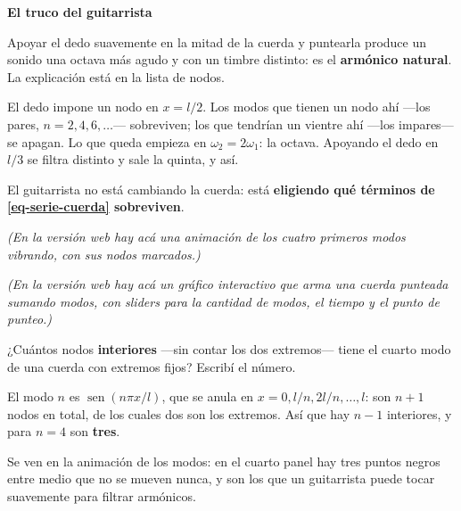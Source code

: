 \documentclass[
  spanish,
  a4paper,
]{scrbook}
\theoremstyle{definition}
\theoremstyle{plain}
\theoremstyle{definition}
\theoremstyle{plain}
\theoremstyle{definition}
\theoremstyle{remark}
\begin{document}
\begin{tcolorbox}[enhanced jigsaw, arc=.35mm, bottomrule=.15mm, breakable, colback=white, colframe=quarto-callout-important-color-frame, left=2mm, leftrule=.75mm, opacityback=0, rightrule=.15mm, toprule=.15mm]
\begin{minipage}[t]{5.5mm}
\textcolor{quarto-callout-important-color}{\faExclamation}
\end{minipage}%
\begin{minipage}[t]{\textwidth - 5.5mm}

\vspace{-3mm}\textbf{El truco del guitarrista}\vspace{3mm}

Apoyar el dedo suavemente en la mitad de la cuerda y puntearla produce
un sonido una octava más agudo y con un timbre distinto: es el
\textbf{armónico natural}. La explicación está en la lista de nodos.

El dedo impone un nodo en \(x=l/2\). Los modos que tienen un nodo ahí
---los pares, \(n=2,4,6,\dots\)--- sobreviven; los que tendrían un
vientre ahí ---los impares--- se apagan. Lo que queda empieza en
\(\omega_2 = 2\omega_1\): la octava. Apoyando el dedo en \(l/3\) se
filtra distinto y sale la quinta, y así.

El guitarrista no está cambiando la cuerda: está \textbf{eligiendo qué
términos de \ref{eq-serie-cuerda} sobreviven}.

\end{minipage}%
\end{tcolorbox}

\emph{(En la versión web hay acá una animación de los cuatro primeros
modos vibrando, con sus nodos marcados.)}

\emph{(En la versión web hay acá un gráfico interactivo que arma una
cuerda punteada sumando modos, con sliders para la cantidad de modos, el
tiempo y el punto de punteo.)}

¿Cuántos nodos \textbf{interiores} ---sin contar los dos extremos---
tiene el cuarto modo de una cuerda con extremos fijos? Escribí el
número.

El modo \(n\) es \(\operatorname{sen}(n\pi x/l)\), que se anula en
\(x = 0, l/n, 2l/n,\dots,l\): son \(n+1\) nodos en total, de los cuales
dos son los extremos. Así que hay \(n-1\) interiores, y para \(n=4\) son
\textbf{tres}.

Se ven en la animación de los modos: en el cuarto panel hay tres puntos
negros entre medio que no se mueven nunca, y son los que un guitarrista
puede tocar suavemente para filtrar armónicos.
\end{document}
